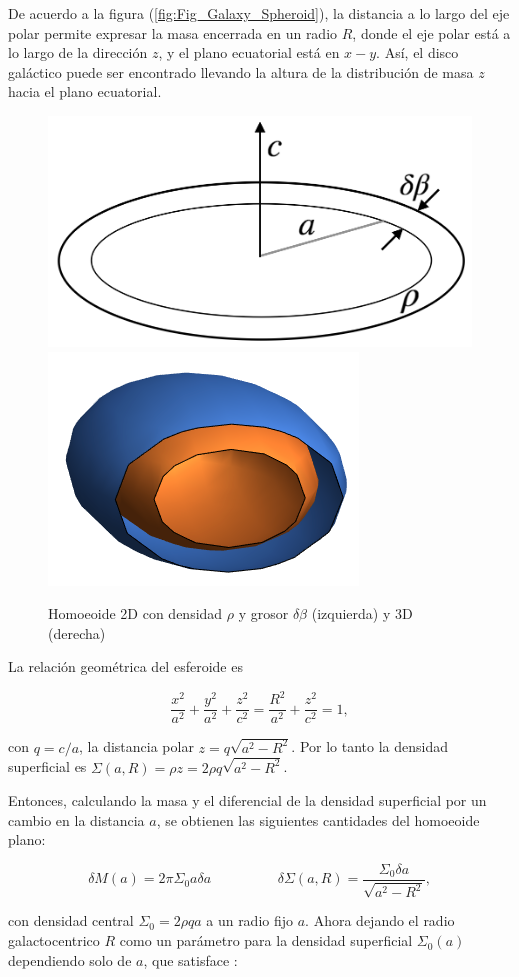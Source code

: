 De acuerdo a la figura (\ref{fig:Fig_Galaxy_Spheroid}), la distancia a lo largo del eje polar permite expresar la masa encerrada en un radio $R$, donde el eje polar está a lo largo de la dirección $z$, y el plano ecuatorial está en $x-y$. Así, el disco galáctico puede ser encontrado llevando la altura de la distribución de masa $z$ hacia el plano ecuatorial.

\begin{figure}
\centering%
\includegraphics[width=0.45\columnwidth]{Kap2/homoeoid2D.png}
\includegraphics[width=0.45\columnwidth]{Kap2/homoeoid3D.png}
\caption{Homoeoide 2D con densidad $\rho$ y grosor $\delta\beta$ (izquierda) y 3D (derecha) }
\label{fig:homoeoid}
\end{figure}


La relación geométrica del esferoide es

$$ \frac{x^2}{a^2} + \frac{y^2}{a^2} + \frac{z^2}{c^2} = \frac{R^2}{a^2} + \frac{z^2}{c^2} = 1, $$

con $q=c/a$, la distancia polar $ z = q\sqrt{a^2 - R^2} $. Por lo tanto la densidad superficial es $\Sigma (a,R) = \rho z = 2\rho q \sqrt{a^2-R^2}$.

Entonces, calculando la masa y el diferencial de la densidad superficial por un cambio en la  distancia $a$, se obtienen las siguientes cantidades del homoeoide plano:

$$ \delta M(a) = 2\pi \Sigma_0 a \delta a \hspace{ 2cm } \delta \Sigma(a,R) = \frac{\Sigma_0 \delta a}{\sqrt{a^2-R^2}}, $$

con densidad central $\Sigma_0 = 2\rho q a$ a un radio fijo $a$. Ahora dejando el radio galactocentrico $R$ como un parámetro para la densidad superficial $\Sigma_0(a)$ dependiendo solo de $a$, que satisface \cite{BT}:

